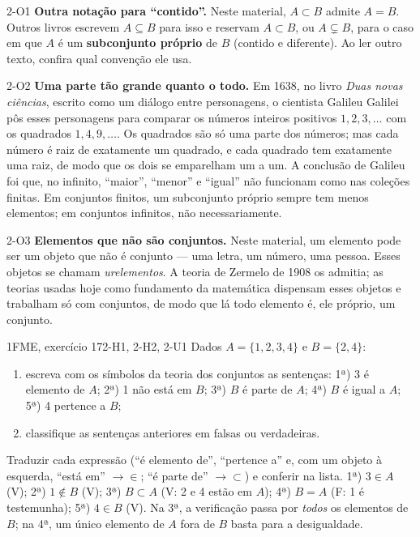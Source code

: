 \Observacoes

\begin{obs}{2-O1}
\textbf{Outra notação para \enquote{contido}.} Neste material, $A\subset B$ admite $A=B$. Outros livros escrevem $A\subseteq B$ para isso e reservam $A\subset B$, ou $A\subsetneq B$, para o caso em que $A$ é um \textbf{subconjunto próprio} de $B$ (contido e diferente). Ao ler outro texto, confira qual convenção ele usa.
\end{obs}

\begin{obs}{2-O2}
\textbf{Uma parte tão grande quanto o todo.} Em 1638, no livro \emph{Duas novas ciências}, escrito como um diálogo entre personagens, o cientista Galileu Galilei pôs esses personagens para comparar os números inteiros positivos $1,2,3,\ldots$ com os quadrados $1,4,9,\ldots$. Os quadrados são só uma parte dos números; mas cada número é raiz de exatamente um quadrado, e cada quadrado tem exatamente uma raiz, de modo que os dois se emparelham um a um. A conclusão de Galileu foi que, no infinito, \enquote{maior}, \enquote{menor} e \enquote{igual} não funcionam como nas coleções finitas. Em conjuntos finitos, um subconjunto próprio sempre tem menos elementos; em conjuntos infinitos, não necessariamente.
\end{obs}

\begin{obs}{2-O3}
\textbf{Elementos que não são conjuntos.} Neste material, um elemento pode ser um objeto que não é conjunto — uma letra, um número, uma pessoa. Esses objetos se chamam \emph{urelementos}. A teoria de Zermelo de 1908 os admitia; as teorias usadas hoje como fundamento da matemática dispensam esses objetos e trabalham só com conjuntos, de modo que lá todo elemento é, ele próprio, um conjunto.
\end{obs}

\Exemplos

\begin{exemplo}{}{1}{FME, exercício 17}{2-H1, 2-H2, 2-U1}
\label{ex:u2:fme17}
Dados $A=\{1,2,3,4\}$ e $B=\{2,4\}$:
\begin{enumerate}[label=\alph*)]
  \item escreva com os símbolos da teoria dos conjuntos as sentenças: 1ª) 3 é elemento de $A$; 2ª) 1 não está em $B$; 3ª) $B$ é parte de $A$; 4ª) $B$ é igual a $A$; 5ª) 4 pertence a $B$;
  \item classifique as sentenças anteriores em falsas ou verdadeiras.
\end{enumerate}
\plano Traduzir cada expressão (\enquote{é elemento de}, \enquote{pertence a} e, com um objeto à esquerda, \enquote{está em} $\to\in$; \enquote{é parte de} $\to\subset$) e conferir na lista.
\resolucao 1ª) $3\in A$ (V); 2ª) $1\notin B$ (V); 3ª) $B\subset A$ (V: 2 e 4 estão em $A$); 4ª) $B=A$ (F: 1 é testemunha); 5ª) $4\in B$ (V).
\comentario Na 3ª, a verificação passa por \emph{todos} os elementos de $B$; na 4ª, um único elemento de $A$ fora de $B$ basta para a desigualdade.
\end{exemplo}

